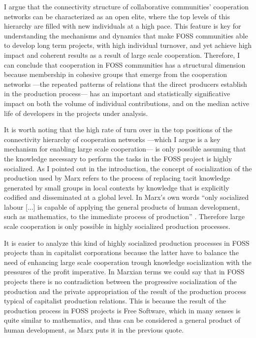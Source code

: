 I argue that the connectivity structure of collaborative communities' cooperation networks can be characterized as an open elite, where the top levels of this hierarchy are filled with new individuals at a high pace. This feature is key for understanding the mechanisms and dynamics that make FOSS communities able to develop long term projects, with high individual turnover, and yet achieve high impact and coherent results as a result of large scale cooperation. Therefore, I can conclude that cooperation in FOSS communities has a structural dimension because membership in cohesive groups that emerge from the cooperation networks ---the repeated patterns of relations that the direct producers establish in the production process--- has an important and statistically significative impact on both the volume of individual contributions, and on the median active life of developers in the projects under analysis.

It is worth noting that the high rate of turn over in the top positions of the connectivity hierarchy of cooperation networks ---which I argue is a key mechanism for enabling large scale cooperation--- is only possible assuming that the knowledge necessary to perform the tasks in the FOSS project is highly socialized. As I pointed out in the introduction, the concept of socialization of the production used by Marx refers to the process of replacing tacit knowledge generated by small groups in local contexts by knowledge that is explicitly codified and disseminated at a global level. In Marx's own words ``only socialized labour [...] is capable of applying the general products of human development, such as mathematics, to the immediate process of production'' \citep[1024]{marx:1990}. Therefore large scale cooperation is only possible in highly socialized production processes.

It is easier to analyze this kind of highly socialized production processes in FOSS projects than in capitalist corporations because the latter have to balance the need of enhancing large scale cooperation trough knowledge socialization with the pressures of the profit imperative. In Marxian terms we could say that in FOSS projects there is no contradiction between the progressive socialization of the production and the private appropriation of the result of the production process typical of capitalist production relations. This is because the result of the production process in FOSS projects is Free Software, which in many senses is quite similar to mathematics, and thus can be considered a general product of human development, as Marx puts it in the previous quote.


